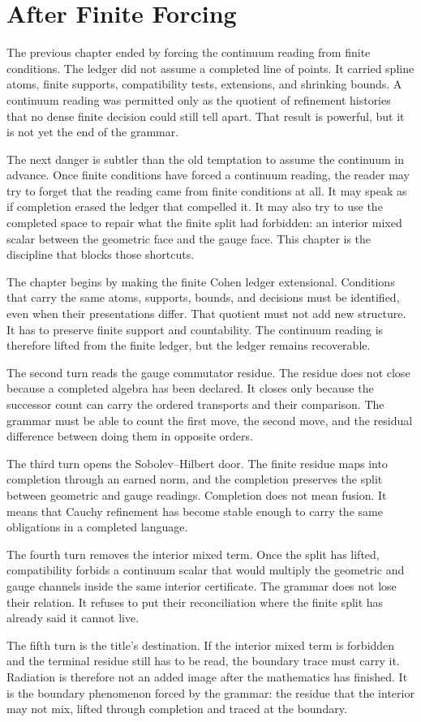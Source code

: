 \section{After Finite Forcing}

The previous chapter ended by forcing the continuum reading from finite
conditions. The ledger did not assume a completed line of points. It carried
spline atoms, finite supports, compatibility tests, extensions, and shrinking
bounds. A continuum reading was permitted only as the quotient of refinement
histories that no dense finite decision could still tell apart. That result is
powerful, but it is not yet the end of the grammar.

The next danger is subtler than the old temptation to assume the continuum in
advance. Once finite conditions have forced a continuum reading, the reader may
try to forget that the reading came from finite conditions at all. It may speak
as if completion erased the ledger that compelled it. It may also try to use
the completed space to repair what the finite split had forbidden: an interior
mixed scalar between the geometric face and the gauge face. This chapter is the
discipline that blocks those shortcuts.

The chapter begins by making the finite Cohen ledger extensional. Conditions
that carry the same atoms, supports, bounds, and decisions must be identified,
even when their presentations differ. That quotient must not add new
structure. It has to preserve finite support and countability. The continuum
reading is therefore lifted from the finite ledger, but the ledger remains
recoverable.

The second turn reads the gauge commutator residue. The residue does not close
because a completed algebra has been declared. It closes only because the
successor count can carry the ordered transports and their comparison. The
grammar must be able to count the first move, the second move, and the
residual difference between doing them in opposite orders.

The third turn opens the Sobolev--Hilbert door. The finite residue maps into
completion through an earned norm, and the completion preserves the split
between geometric and gauge readings. Completion does not mean fusion. It
means that Cauchy refinement has become stable enough to carry the same
obligations in a completed language.

The fourth turn removes the interior mixed term. Once the split has lifted,
compatibility forbids a continuum scalar that would multiply the geometric and
gauge channels inside the same interior certificate. The grammar does not lose
their relation. It refuses to put their reconciliation where the finite split
has already said it cannot live.

The fifth turn is the title's destination. If the interior mixed term is
forbidden and the terminal residue still has to be read, the boundary trace
must carry it. Radiation is therefore not an added image after the mathematics
has finished. It is the boundary phenomenon forced by the grammar: the residue
that the interior may not mix, lifted through completion and traced at the
boundary.

